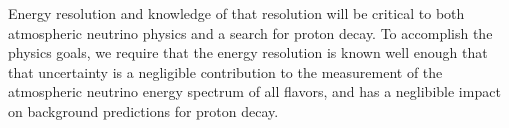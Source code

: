 Energy resolution and knowledge of that resolution will be critical to both
atmospheric neutrino physics and a search for proton decay.  To accomplish the
physics goals, we require that the energy resolution is known well enough that
that uncertainty is a negligible contribution to the measurement of the
atmospheric neutrino energy spectrum of all flavors, and has a neglibible
impact on background predictions for proton decay.
